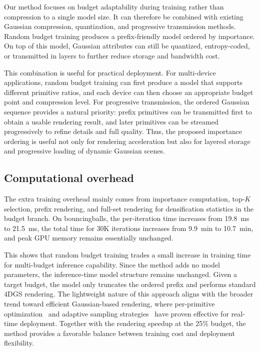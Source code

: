\documentclass[pdflatex,sn-mathphys]{sn-jnl}
\begin{document}
Our method focuses on budget adaptability during training rather than compression to a single model size. It can therefore be combined with existing Gaussian compression, quantization, and progressive transmission methods. Random budget training produces a prefix-friendly model ordered by importance. On top of this model, Gaussian attributes can still be quantized, entropy-coded, or transmitted in layers to further reduce storage and bandwidth cost.

This combination is useful for practical deployment. For multi-device applications, random budget training can first produce a model that supports different primitive ratios, and each device can then choose an appropriate budget point and compression level. For progressive transmission, the ordered Gaussian sequence provides a natural priority: prefix primitives can be transmitted first to obtain a usable rendering result, and later primitives can be streamed progressively to refine details and full quality. Thus, the proposed importance ordering is useful not only for rendering acceleration but also for layered storage and progressive loading of dynamic Gaussian scenes.

\subsection{Computational overhead}

The extra training overhead mainly comes from importance computation, top-$K$ selection, prefix rendering, and full-set rendering for densification statistics in the budget branch. On bouncingballs, the per-iteration time increases from 19.8~ms to 21.5~ms, the total time for 30K iterations increases from 9.9~min to 10.7~min, and peak GPU memory remains essentially unchanged.

This shows that random budget training trades a small increase in training time for multi-budget inference capability. Since the method adds no model parameters, the inference-time model structure remains unchanged. Given a target budget, the model only truncates the ordered prefix and performs standard 4DGS rendering. The lightweight nature of this approach aligns with the broader trend toward efficient Gaussian-based rendering, where per-primitive optimization~\cite{zhang2026dho3dgs} and adaptive sampling strategies~\cite{xu2024efficient} have proven effective for real-time deployment. Together with the rendering speedup at the 25\% budget, the method provides a favorable balance between training cost and deployment flexibility.
\end{document}
